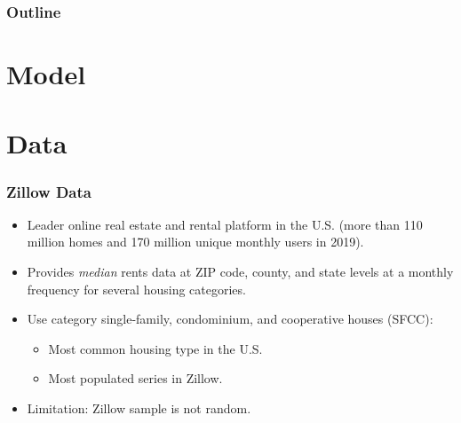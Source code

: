 \documentclass[aspectratio=169, t]{beamer}
\begin{document}
\begin{frame}
\begin{columns}
\begin{column}{0.50\textwidth}
\begin{figure}
            \end{figure}   
        \end{column}
    \end{columns}
\end{frame}

\begin{frame}
	\frametitle{Outline}
	\tableofcontents[hideallsubsections]
\end{frame}

\section{Model}

\section{Data}


\begin{frame}[label = zillow]
	\frametitle{Zillow Data}
	
	\begin{itemize}
		\item Leader online real estate and rental platform in the U.S. {\small (more 
		than 110 million homes and 170 million unique monthly users in 2019).}
		
		\vspace{2mm} \item
		Provides \textit{median} rents data at ZIP code, county, and state levels 
		at a monthly frequency for several housing categories.
		
		\pause
		\vspace{2mm} \item
		Use category single-family, condominium, and cooperative houses (SFCC):
		\begin{itemize}
			\item Most common housing type in the U.S.
			\item Most populated series in Zillow.
		\end{itemize}
		
		\pause
		\vspace{2mm} \item
		Limitation: Zillow sample is not random.
	\end{itemize}
\end{frame}
\end{document}

